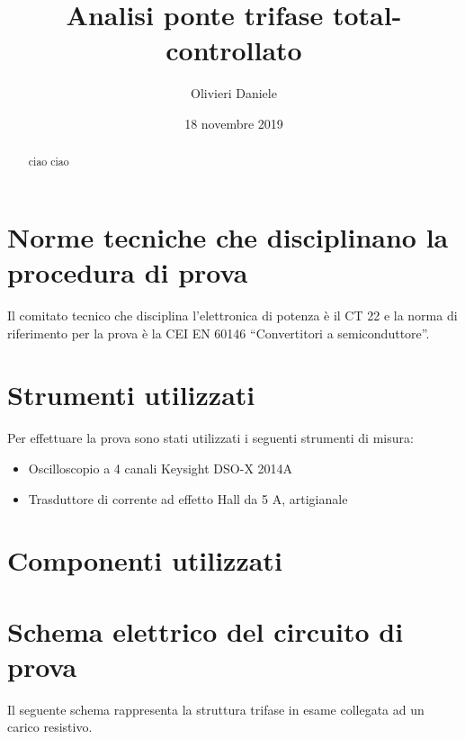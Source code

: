 \documentclass[a4paper,10pt]{article}
\title{Analisi ponte trifase total-controllato}
\author{Olivieri Daniele}
\date{18 novembre 2019}
\begin{document}
\maketitle

\begin{abstract}
 ciao ciao
\end{abstract}

\section{Norme tecniche che disciplinano la procedura di prova}
Il comitato tecnico che disciplina l'elettronica di potenza è il CT 22 e la norma
di riferimento per la prova è la CEI EN 60146 ``Convertitori a semiconduttore''.

\section{Strumenti utilizzati}
Per effettuare la prova sono stati utilizzati i seguenti strumenti di misura:
\begin{itemize}
 \item Oscilloscopio a 4 canali Keysight DSO-X 2014A
 \item Trasduttore di corrente ad effetto Hall da 5 A, artigianale
\end{itemize}

\section{Componenti utilizzati}

\section{Schema elettrico del circuito di prova}
Il seguente schema rappresenta la struttura trifase in esame collegata ad un
carico resistivo.
\end{document}
